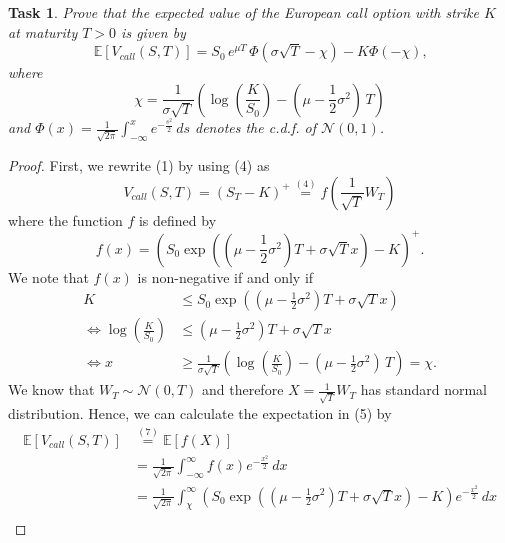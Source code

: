 \documentclass{scrartcl}
\newtheorem{task}{Task}
\begin{document}
	\begin{task}
		Prove that the expected value of the European call option with strike $K$ at maturity $T>0$ is given by
		\begin{equation}
			\mathbb{E}\left[V_{call}(S, T)\right] = S_0\,e^{\mu T}\,\Phi(\sigma\sqrt{T}-\chi)-K\Phi(-\chi)\text{,}
		\end{equation}
		where
		\begin{equation}
			\chi = \frac{1}{\sigma\sqrt{T}}\left(\log\left(\frac{K}{S_0}\right) - \left(\mu - \frac{1}{2}\sigma^2\right)\,T\right)
		\end{equation}
		and $\Phi(x)=\frac{1}{\sqrt{2\pi}}\int_{-\infty}^{x} e^{-\frac{s^2}{2}}\,ds$ denotes the c.d.f. of $\mathcal{N}(0,1)$.
	\end{task}
	\begin{proof}
		First, we rewrite (1) by using (4) as
		\begin{equation}
			V_{call}(S, T) = (S_T - K)^+ \stackrel{(4)}{=} f\left(\frac{1}{\sqrt{T}}W_T\right)
		\end{equation}
		where the function $f$ is defined by
		\begin{equation*}
		f(x) = \left(S_0\exp\left(\left(\mu - \frac{1}{2}\sigma^2\right)T + \sigma \sqrt{T} x\right) - K\right)^+\text{.}
		\end{equation*}
		We note that $f(x)$ is non-negative if and only if
		\begin{align*}
			 K &\leq S_0\exp\left(\left(\mu - \frac{1}{2}\sigma^2\right)T + \sigma \sqrt{T} x\right) \\
			\Leftrightarrow
			\log\left(\frac{K}{S_0}\right) &\leq \left(\mu - \frac{1}{2}\sigma^2\right)T + \sigma \sqrt{T} x  \\
			\Leftrightarrow
			x &\geq \frac{1}{\sigma\sqrt{T}}\left(\log\left(\frac{K}{S_0}\right) - \left(\mu - \frac{1}{2}\sigma^2\right)\,T\right) = \chi\text{.}
		\end{align*}
		We know that $W_T\sim\mathcal{N}(0,T)$ and therefore $X = \frac{1}{\sqrt{T}}W_T$ has standard normal distribution. Hence, we can calculate the expectation in (5) by
		\begin{align*}
			\mathbb{E}\left[V_{call}(S, T)\right] &\stackrel{(7)}{=} \mathbb{E}\left[f(X)\right] \\
			&= \frac{1}{\sqrt{2\pi}}\int_{-\infty}^{\infty}f(x) e^{-\frac{x^2}{2}}\,dx \\
			&= \frac{1}{\sqrt{2\pi}}\int_{\chi}^{\infty} \left(S_0\exp\left(\left(\mu - \frac{1}{2}\sigma^2\right)T + \sigma \sqrt{T} x\right) - K\right)e^{-\frac{x^2}{2}}\,dx \\

\end{align*}
\end{proof}
\end{document}
